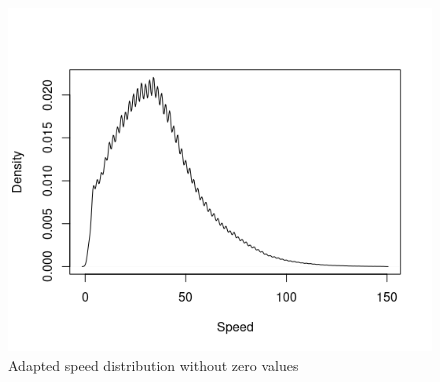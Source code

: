 \documentclass[11pt,conference,a4paper,onecolumn,romanappendices]{IEEEtran}
\begin{document}
\begin{figure}
\includegraphics[scale=0.67]{speed.png}
\caption{\label{fig:speed}Adapted speed distribution without zero values}
\end{figure}
\end{document}
